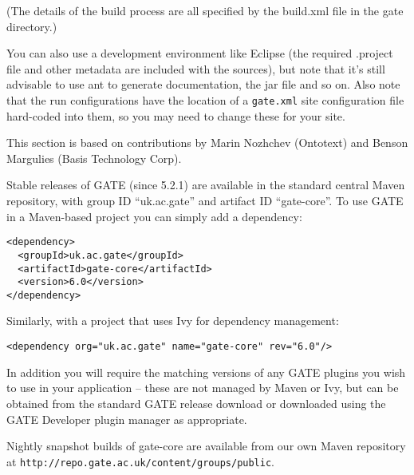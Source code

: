 (The details of the build process are all specified by the build.xml file 
in the gate directory.)

You can also use a development environment like Eclipse (the required .project
file and other metadata are included with the sources), but note that it's still
advisable to use ant to generate documentation, the jar file and so on. Also
note that the run configurations have the location of a {\tt gate.xml} site
configuration file hard-coded into them, so you may need to change these for
your site.


This section is based on contributions by Marin Nozhchev (Ontotext) and Benson
Margulies (Basis Technology Corp).

Stable releases of GATE (since 5.2.1) are available in the standard central
Maven repository, with group ID ``uk.ac.gate'' and artifact ID ``gate-core''.
To use GATE in a Maven-based project you can simply add a dependency:
\begin{small}
\begin{verbatim}
<dependency>
  <groupId>uk.ac.gate</groupId>
  <artifactId>gate-core</artifactId>
  <version>6.0</version>
</dependency>
\end{verbatim}
\end{small}

Similarly, with a project that uses Ivy for dependency management:
\begin{small}
\begin{verbatim}
<dependency org="uk.ac.gate" name="gate-core" rev="6.0"/>
\end{verbatim}
\end{small}

In addition you will require the matching versions of any GATE plugins you wish
to use in your application -- these are not managed by Maven or Ivy, but can be
obtained from the standard GATE release download or downloaded using the GATE
Developer plugin manager as appropriate.

Nightly snapshot builds of gate-core are available from our own Maven
repository at \verb|http://repo.gate.ac.uk/content/groups/public|.


